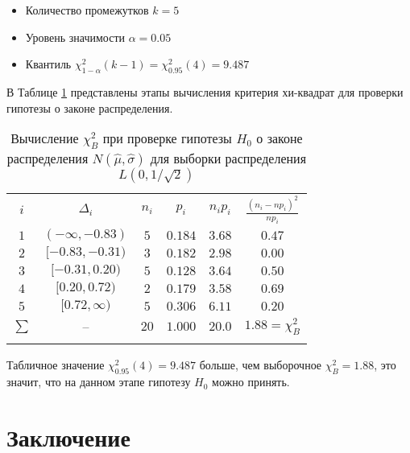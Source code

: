 \documentclass[12pt]{article}
\begin{document}
\begin{flushleft}
			\begin{itemize}
				\item Количество промежутков $k=5$
				\item Уровень значимости $\alpha = 0.05$
				\item Квантиль $\chi^2_{1-\alpha}(k-1) = \chi^2_{0.95}(4) = 9.487$
			\end{itemize}

			В Таблице \ref{chi_laplace} представлены этапы вычисления критерия хи-квадрат для проверки гипотезы о законе распределения.

			\begin{table}[h]
				\begin{center}
					\caption{Вычисление $\chi^2_B$ при проверке гипотезы $H_0$ о законе распределения $N(\hat{\mu}, \hat{\sigma})$ для выборки распределения $L(0, 1/\sqrt{2})$}
					\begin{tabular}{||c|*{4}{c|}c||} \hhline{|t:=:=:=:=:=:=:t|}
						$i$    & $\Delta_i$         & $n_i$ & $p_i$ & $n_ip_i$ & $\frac{(n_i-np_i)^2}{np_i}$ \\
						\hhline{|:=:=:=:=:=:=:|}
						$1$    & $(-\infty, -0.83)$ & $5$  & $0.184$ & $3.68$ & $0.47$ \\
						\hhline{||-|-|-|-|-|-||}
						$2$    & $[-0.83, -0.31)$   & $3$  & $0.182$ & $2.98$ & $0.00$ \\
						\hhline{||-|-|-|-|-|-||}
						$3$    & $[-0.31, 0.20)$    & $5$  & $0.128$ & $3.64$ & $0.50$ \\
						\hhline{||-|-|-|-|-|-||}
						$4$    & $[0.20, 0.72)$     & $2$  & $0.179$ & $3.58$ & $0.69$ \\
						\hhline{||-|-|-|-|-|-||}
						$5$    & $[0.72, \infty)$   & $5$  & $0.306$ & $6.11$ & $0.20$ \\
						\hhline{|:=:=:=:=:=:=:|}
						$\sum$ & --                 & $20$ & $1.000$ & $20.0$ & $1.88 = \chi^2_B$ \\
						\hhline{|b:=:=:=:=:=:=:b|}
					\end{tabular}
				\label{chi_laplace}
				\end{center}
			\end{table}

			Табличное значение $\chi^2_{0.95}(4) = 9.487$ больше, чем выборочное $\chi^2_B = 1.88$, это значит, что на данном этапе гипотезу $H_0$ можно принять.

\newpage

\section*{Заключение}


\end{flushleft}
\end{document}
